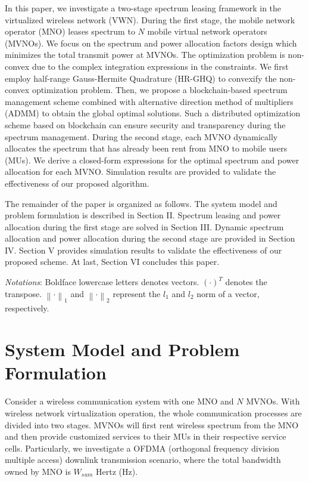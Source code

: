 \documentclass[journal]{IEEEtran}
\begin{document}
\begin{IEEEkeywords}
In this paper, we investigate a two-stage spectrum leasing framework in the virtualized wireless network (VWN). During the first stage, the mobile network operator (MNO) leases spectrum to $N$ mobile virtual network operators (MVNOs). We focus on the spectrum and power allocation factors design which minimizes the total transmit power at MVNOs. The optimization problem is non-convex due to the complex integration expressions in the constraints. We first employ half-range Gauss-Hermite Quadrature (HR-GHQ) to convexify the non-convex optimization problem. Then, we propose a blockchain-based spectrum management scheme combined with alternative direction method of multipliers (ADMM) to obtain the global optimal solutions. Such a distributed optimization scheme based on blockchain can ensure security and transparency during the spectrum management. During the second stage, each MVNO dynamically allocates the spectrum that has already been rent from MNO to mobile users (MUs). We derive a closed-form expressions for the optimal spectrum and power allocation for each MVNO. Simulation results are provided to validate the effectiveness of our proposed algorithm.

The remainder of the paper is organized as follows. The system model and problem formulation is described in Section II. Spectrum leasing and power allocation during the first stage are solved in Section III. Dynamic spectrum allocation and power allocation during the second stage are provided in Section IV. Section V provides simulation results to validate the effectiveness of our proposed scheme. At last, Section VI concludes this paper.

\emph{Notations}: Boldface lowercase letters denotes vectors. $\left(\cdot\right)^T$ denotes the transpose. $\left\|\cdot \right\|_1$ and $\left\|\cdot \right\|_2$ represent the $l_1$ and $l_2$ norm of a vector, respectively.
\section{System Model and Problem Formulation}
Consider a wireless communication system with one MNO and $N$ MVNOs. With wireless network virtualization operation, the whole communication processes are divided into two stages. MVNOs will first rent wireless spectrum from the MNO and then provide customized services to their MUs in their respective service cells. Particularly, we investigate a OFDMA (orthogonal frequency division multiple access) downlink transmission scenario, where the total bandwidth owned by MNO is $W_{sum}$ Hertz (Hz). 


\end{IEEEkeywords}
\end{document}

